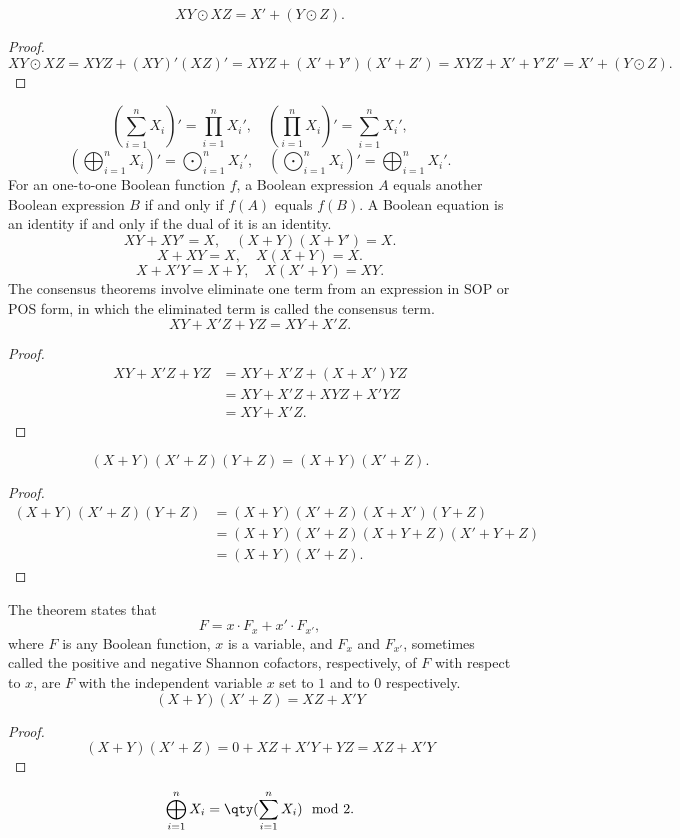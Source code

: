 \documentclass[a4paper,12pt]{article}
\begin{document}
\begin{itemize}
\begin{itemize}
\begin{itemize}
\begin{itemize}
\begin{itemize}
\begin{itemize}
\begin{itemize}
\[XY\odot XZ=X'+(Y\odot Z).\]
\begin{proof}
\[XY\odot XZ=XYZ+(XY)'(XZ)'=XYZ+(X'+Y')(X'+Z')=XYZ+X'+Y'Z'=X'+(Y\odot Z).\]
\end{proof}
\[(\sum_{i=1}^nX_i)′=\prod_{i=1}^nX_i',\quad (\prod_{i=1}^nX_i)'=\sum_{i=1}^nX_i',\]
\[(\bigoplus_{i=1}^nX_i)′=\bigodot_{i=1}^nX_i',\quad (\bigodot_{i=1}^nX_i)'=\bigoplus_{i=1}^nX_i'.\]
For an one-to-one Boolean function $f$, a Boolean expression $A$ equals another Boolean expression $B$ if and only if $f(A)$ equals $f(B)$.
A Boolean equation is an identity if and only if the dual of it is an identity.
\[XY+XY'=X,\quad (X+Y)(X+Y')=X.\]
\[X+XY=X,\quad X(X+Y)=X.\]
\[X+X'Y=X+Y,\quad X(X'+Y)=XY.\]
The consensus theorems involve eliminate one term from an expression in SOP or POS form, in which the eliminated term is called the consensus term.
\[XY+X′Z+YZ=XY+X′Z.\]
\begin{proof}
\[\begin{aligned}
XY+X′Z+YZ&=XY+X'Z+(X+X')YZ\\
&=XY+X'Z+XYZ+X'YZ\\
&=XY+X′Z.
\end{aligned}\]
\end{proof}
\[(X+Y)(X′+Z)(Y+Z)=(X+Y)(X′+Z).\]
\begin{proof}
\[\begin{aligned}
(X+Y)(X′+Z)(Y+Z)&=(X+Y)(X'+Z)(X+X')(Y+Z)\\
&=(X+Y)(X'+Z)(X+Y+Z)(X'+Y+Z)\\
&=(X+Y)(X′+Z).
\end{aligned}\]
\end{proof}
The theorem states that
\[F=x\cdot F_x+x'\cdot F_{x'},\]
where $F$ is any Boolean function, $x$ is a variable, and $F_x$ and $F_{x'}$, sometimes called the positive and negative Shannon cofactors, respectively, of $F$ with respect to $x$, are $F$ with the independent variable $x$ set to $1$ and to $0$ respectively.
\[(X+Y)(X'+Z)=XZ+X'Y\]
\begin{proof}
\[(X+Y)(X'+Z)=0+XZ+X'Y+YZ=XZ+X'Y\]
\end{proof}
\[\bigoplus_{i=1}^nX_i=\qty(\sum_{i=1}^nX_i)\mod 2.\]

\end{itemize}
\end{itemize}
\end{itemize}
\end{itemize}
\end{itemize}
\end{itemize}
\end{itemize}
\end{document}
